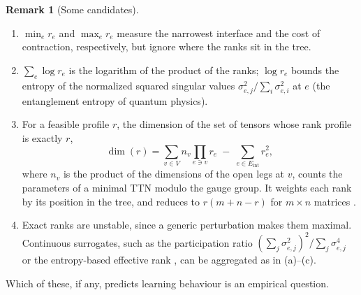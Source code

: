 \documentclass[11pt]{article}
\newcommand{\Eint}{E_{\mathrm{int}}}
\theoremstyle{definition}
\newtheorem{remark}[theorem]{Remark}
\numberwithin{equation}{section}
\begin{document}
\begin{remark}[Some candidates]\label{rem:capacity-candidates}
\leavevmode
\begin{enumerate}[label=(\alph*),nosep]
\item $\min_er_e$ and $\max_er_e$ measure the narrowest interface and the cost of contraction, respectively, but ignore where the ranks sit in the tree.
\item $\sum_e\log r_e$ is the logarithm of the product of the ranks; $\log r_e$ bounds the entropy of the normalized squared singular values $\sigma_{e,j}^2/\sum_i\sigma_{e,i}^2$ at $e$ (the entanglement entropy of quantum physics).
\item For a feasible profile $r$, the dimension of the set of tensors whose rank profile is exactly $r$,
\[
\dim(r)=\sum_{v\in V}n_v\prod_{e\ni v}r_e\;-\;\sum_{e\in\Eint}r_e^2,
\]
where $n_v$ is the product of the dimensions of the open legs at $v$, counts the parameters of a minimal TTN modulo the gauge group. It weights each rank by its position in the tree, and reduces to $r(m+n-r)$ for $m\times n$ matrices \citep{holtz2012manifolds,uschmajew2013geometry}.
\item Exact ranks are unstable, since a generic perturbation makes them maximal. Continuous surrogates, such as the participation ratio $(\sum_j\sigma_{e,j}^2)^2/\sum_j\sigma_{e,j}^4$ \citep[Section~9.4]{hfl_diagonal} or the entropy-based effective rank \citep{roy2007effective}, can be aggregated as in (a)--(c).
\end{enumerate}
Which of these, if any, predicts learning behaviour is an empirical question.
\end{remark}
\end{document}
